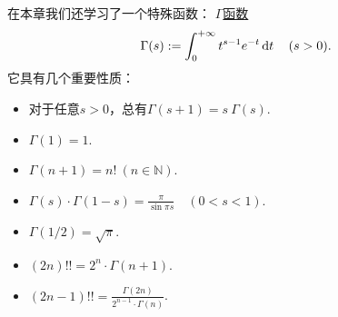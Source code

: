在本章我们还学习了一个特殊函数：
\hyperref[equation:特殊函数.伽马函数的积分定义]{\(\Gamma\)函数}\begin{equation*}
	\Gamma(s)
	:=
	\int_0^{+\infty} t^{s-1} e^{-t} \dd{t}
	\quad(s>0).
\end{equation*}
它具有几个重要性质：\begin{itemize}
	\item 对于任意\(s > 0\)，总有\(\Gamma(s+1) = s~\Gamma(s)\).
	\item \(\Gamma(1) = 1\).
	\item \(\Gamma(n+1) = n!\ (n\in\mathbb{N})\).
	\item \(\Gamma(s) \cdot \Gamma(1-s) = \frac{\pi}{\sin{\pi s}} \quad (0 < s < 1)\).
	\item \(\Gamma\left(1/2\right) = \sqrt{\pi}\).
	\item \((2n)!! = 2^n \cdot \Gamma(n+1)\).
	\item \((2n-1)!! = \frac{\Gamma(2n)}{2^{n-1} \cdot \Gamma(n)}\).
\end{itemize}
